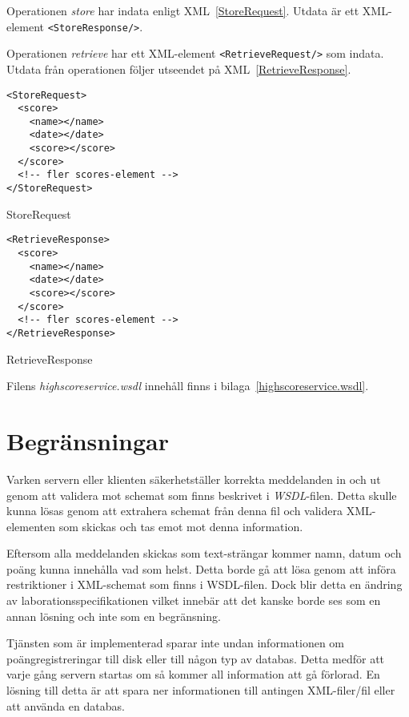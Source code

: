 \documentclass[a4paper, 12pt]{article}
\begin{document}
Operationen \textit{store} har indata enligt
XML~\ref{StoreRequest}. Utdata är ett XML-element
\verb!<StoreResponse/>!.

Operationen \textit{retrieve} har ett XML-element
\verb!<RetrieveRequest/>! som indata. Utdata från operationen följer
utseendet på XML~\ref{RetrieveResponse}.

\begin{xml}
\begin{verbatim}
<StoreRequest>
  <score>
    <name></name>
    <date></date>
    <score></score>
  </score>
  <!-- fler scores-element -->
</StoreRequest>
\end{verbatim}
  \caption{StoreRequest}\label{StoreRequest}
\end{xml}


\begin{xml}
\begin{verbatim}
<RetrieveResponse>
  <score>
    <name></name>
    <date></date>
    <score></score>
  </score>
  <!-- fler scores-element -->
</RetrieveResponse>
\end{verbatim}
  \caption{RetrieveResponse}\label{RetrieveResponse}
\end{xml}

Filens \textit{highscoreservice.wsdl} innehåll finns i
bilaga~\ref{highscoreservice.wsdl}.

\section{Begränsningar}\label{Begransningar}
Varken servern eller klienten säkerhetställer korrekta meddelanden in
och ut genom att validera mot schemat som finns beskrivet i
\textit{WSDL}-filen. Detta skulle kunna lösas genom att extrahera
schemat från denna fil och validera XML-elementen som skickas och tas
emot mot denna information.

Eftersom alla meddelanden skickas som text-strängar kommer namn, datum
och poäng kunna innehålla vad som helst. Detta borde gå att lösa genom
att införa restriktioner i XML-schemat som finns i WSDL-filen. Dock
blir detta en ändring av laborationsspecifikationen vilket innebär att
det kanske borde ses som en annan lösning och inte som en begränsning.

Tjänsten som är implementerad sparar inte undan informationen om
poängregistreringar till disk eller till någon typ av databas. Detta
medför att varje gång servern startas om så kommer all information att
gå förlorad. En lösning till detta är att spara ner informationen till
antingen XML-filer/fil eller att använda en databas.
\end{document}
